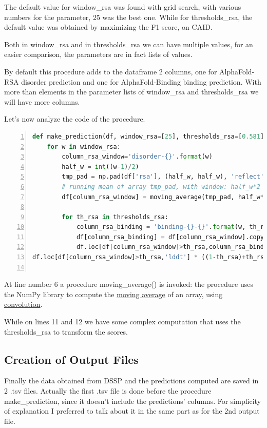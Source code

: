 The default value for window\_rsa was found with grid search, with various numbers for the parameter, 25 was the best one. While for thresholds\_rsa, the default value was obtained by maximizing the F1 score, on CAID.

Both in window\_rsa and in thresholds\_rsa we can have multiple values, for an easier comparison, the parameters are in fact lists of values.

By default this procedure adds to the dataframe 2 columns, one for AlphaFold-RSA disorder prediction and one for AlphaFold-Binding binding prediction. With more than elements in the parameter lists of window\_rsa and thresholds\_rsa we will have more columns.

Let's now analyze the code of the procedure.
\begin{lstlisting}[language=Python, caption=Procedure make\_prediction(), numbers=left, label={code:makepred}]
def make_prediction(df, window_rsa=[25], thresholds_rsa=[0.581]):
    for w in window_rsa:
        column_rsa_window='disorder-{}'.format(w)
        half_w = int((w-1)/2)
        tmp_pad = np.pad(df['rsa'], (half_w, half_w), 'reflect')
        # running mean of array tmp_pad, with window: half_w*2 +1
        df[column_rsa_window] = moving_average(tmp_pad, half_w*2 +1)

        for th_rsa in thresholds_rsa:
            column_rsa_binding = 'binding-{}-{}'.format(w, th_rsa)
            df[column_rsa_binding] = df[column_rsa_window].copy()
            df.loc[df[column_rsa_window]>th_rsa,column_rsa_binding] =
df.loc[df[column_rsa_window]>th_rsa,'lddt'] * ((1-th_rsa)+th_rsa)
        
\end{lstlisting}

At line number 6 a procedure moving\_average() is invoked: the procedure uses the NumPy library to compute the \href{https://en.wikipedia.org/wiki/Moving_average}{\underline{moving average}} of an array, using \href{https://en.wikipedia.org/wiki/Convolution}{\underline{convolution}}. 

While on lines 11 and 12 we have some complex computation that uses the thresholds\_rsa to transform the scores.

\subsection{Creation of Output Files}

Finally the data obtained from DSSP and the predictions computed are saved in 2 .tsv files. Actually the first .tsv file is done before the procedure make\_prediction, since it doesn't include the predictions' columns. For simplicity of explanation I preferred to talk about it in the same part as for the 2nd output file.

